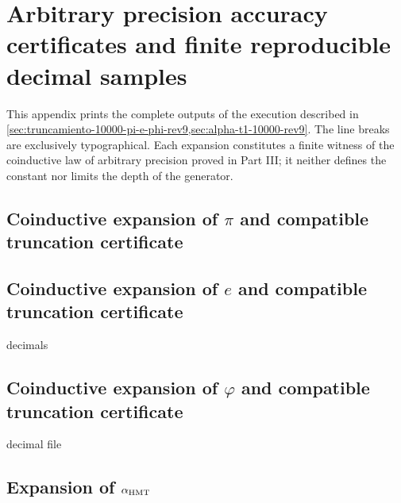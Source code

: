 \chapter{Arbitrary precision accuracy certificates and finite reproducible decimal samples}
\label{app:desarrollos-10000-rev9}

This appendix prints the complete outputs of the execution described in
\cref{sec:truncamiento-10000-pi-e-phi-rev9,sec:alpha-t1-10000-rev9}. The
line breaks are exclusively typographical. Each expansion constitutes
a finite witness of the coinductive law of arbitrary precision proved in
Part III; it neither defines the constant nor limits the depth of the generator.

\begingroup
\lstset{basicstyle=\ttfamily\tiny,breaklines=true,breakatwhitespace=false,
  frame=single,columns=fullflexible,keepspaces=true,numbers=none}

\section{Coinductive expansion of \(\pi\) and compatible truncation certificate}


\section{Coinductive expansion of \(e\) and compatible truncation certificate}
 decimals

\section{Coinductive expansion of \(\varphi\) and compatible truncation certificate}
decimal file 

\section{Expansion of \texorpdfstring{\(\alpha_{\rm HMT}\)}{alpha HMT}}

\endgroup

